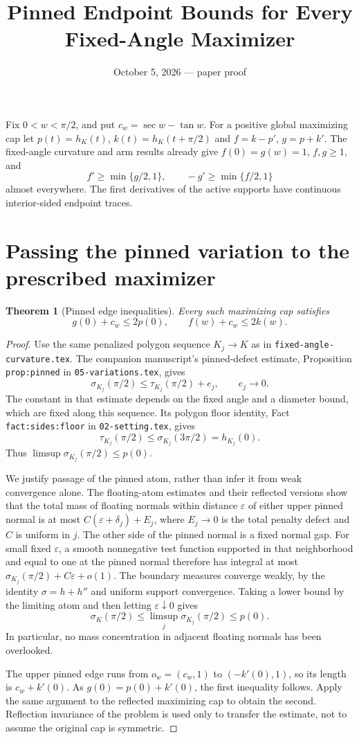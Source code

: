\documentclass[11pt]{article}
\title{Pinned Endpoint Bounds for Every Fixed-Angle Maximizer}
\author{}\date{October 5, 2026 --- paper proof}
\newtheorem{theorem}{Theorem}[section]
\begin{document}
\maketitle
Fix $0<w<\pi/2$, and put $c_w=\sec w-\tan w$. For a positive global maximizing cap let $p(t)=h_K(t)$, $k(t)=h_K(t+\pi/2)$ and $f=k-p'$, $g=p+k'$. The fixed-angle curvature and arm results already give $f(0)=g(w)=1$, $f,g\ge1$, and
\[
 f'\ge\min\{g/2,1\},\qquad -g'\ge\min\{f/2,1\}
\]
almost everywhere. The first derivatives of the active supports have continuous interior-sided endpoint traces.

\section{Passing the pinned variation to the prescribed maximizer}
\begin{theorem}[Pinned edge inequalities]\label{thm:pinned}
Every such maximizing cap satisfies
\[
 \boxed{g(0)+c_w\le2p(0),\qquad f(w)+c_w\le2k(w).}
\]
\end{theorem}
\begin{proof}
Use the same penalized polygon sequence $K_j\to K$ as in \texttt{fixed-angle-curvature.tex}. The companion manuscript's pinned-defect estimate, Proposition \texttt{prop:pinned} in \texttt{05-variations.tex}, gives
\[
 \sigma_{K_j}(\pi/2)\le\tau_{K_j}(\pi/2)+e_j,\qquad e_j\to0.
\]
The constant in that estimate depends on the fixed angle and a diameter bound, which are fixed along this sequence. Its polygon floor identity, Fact \texttt{fact:sides:floor} in \texttt{02-setting.tex}, gives
\[
 \tau_{K_j}(\pi/2)\le\sigma_{K_j}(3\pi/2)=h_{K_j}(0).
\]
Thus $\limsup\sigma_{K_j}(\pi/2)\le p(0)$.

We justify passage of the pinned atom, rather than infer it from weak convergence alone. The floating-atom estimates and their reflected versions show that the total mass of floating normals within distance $\varepsilon$ of either upper pinned normal is at most $C(\varepsilon+\delta_j)+E_j$, where $E_j\to0$ is the total penalty defect and $C$ is uniform in $j$. The other side of the pinned normal is a fixed normal gap. For small fixed $\varepsilon$, a smooth nonnegative test function supported in that neighborhood and equal to one at the pinned normal therefore has integral at most $\sigma_{K_j}(\pi/2)+C\varepsilon+o(1)$. The boundary measures converge weakly, by the identity $\sigma=h+h''$ and uniform support convergence. Taking a lower bound by the limiting atom and then letting $\varepsilon\downarrow0$ gives
\[
 \sigma_K(\pi/2)\le\limsup_j\sigma_{K_j}(\pi/2)\le p(0).
\]
In particular, no mass concentration in adjacent floating normals has been overlooked.

The upper pinned edge runs from $o_w=(c_w,1)$ to $(-k'(0),1)$, so its length is $c_w+k'(0)$. As $g(0)=p(0)+k'(0)$, the first inequality follows. Apply the same argument to the reflected maximizing cap to obtain the second. Reflection invariance of the problem is used only to transfer the estimate, not to assume the original cap is symmetric.
\end{proof}
\end{document}
